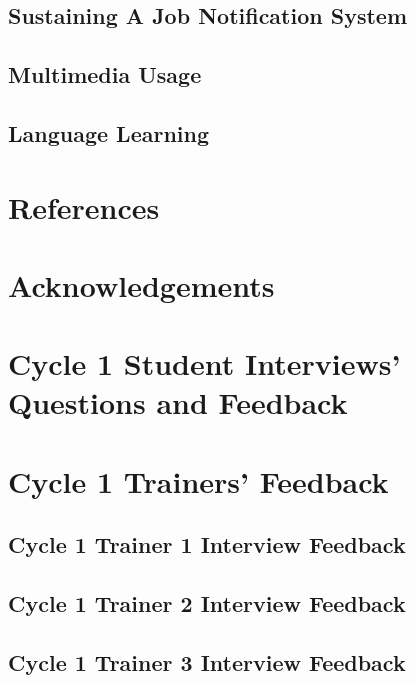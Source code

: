\documentclass[12pt,a4paper,oneside]{report}
\begin{document}
\section{Sustaining A Job Notification System}

\section{Multimedia Usage}

\section{Language Learning}


\chapter{References}





\chapter*{Acknowledgements}


\appendix

\chapter{Cycle 1 Student Interviews’ Questions and Feedback}

\chapter{Cycle 1 Trainers’ Feedback}
\section{Cycle 1 Trainer 1 Interview Feedback}
\section{Cycle 1 Trainer 2 Interview Feedback}
\section{Cycle 1 Trainer 3 Interview Feedback}
\end{document}
